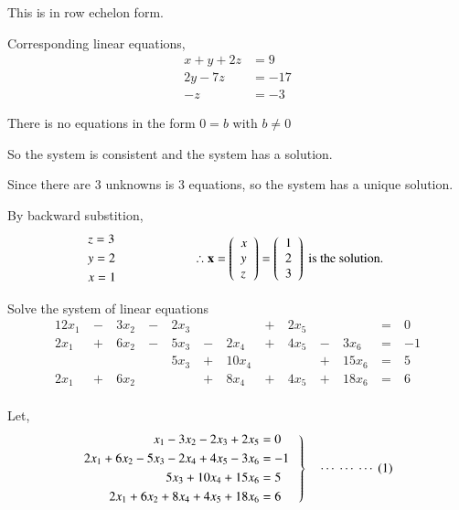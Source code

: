 \documentclass[12pt]{article}
\begin{document}
This is in row echelon form.

Corresponding linear equations,
\vspace{-0.75\baselineskip}
\begin{align*}
   x+y+2z&=9\\
   2y-7z&=-17\\
   -z&=-3
\end{align*}

There is no equations in the form $0=b$ with $b \neq 0$

So the system is consistent and the system has a solution.

Since there are $3$ unknowns is $3$ equations, so the system has a unique solution.


\vspace{2ex}
By backward substition,
\begin{equation*}
\begin{aligned}
& z=3 \\ & y=2 \\ & x=1
\end{aligned} \ \ \ \ \ \  \ \ \ \ \ \  \ \ \ \ \ \  \ \ \ \ \ \  \therefore \mathbf{x}=\left(\begin{array}{l}
x \\ y \\ z
\end{array}\right)=\left(\begin{array}{l}
1 \\ 2 \\ 3
\end{array}\right) \text { is the solution. }
\end{equation*}



\vspace{5ex}
\hrline
{} Solve the system of linear equations
\begin{alignat*}{12}
   x_1 &\ -\ & 3x_2 &\ -\ & 2x_3 &&&\ +\ & 2x_5 &&&\ =\ & 0 \\
   2x_1 &\ +\ & 6x_2 &\ -\ & 5x_3 &\ -\ & 2x_4 &\ +\ & 4x_5 &\ -\ & 3x_6 &\ =\ & -1 \\
   &&&&5x_3 &\ +\ & 10x_4 &&&\ +\ & 15x_6 &\ =\ & 5 \\
   2x_1 &\ +\ & 6x_2 &&&\ +\ & 8x_4 &\ +\ & 4x_5 &\ +\ & 18x_6 &\ =\ & 6 \\
\end{alignat*}

 Let,
\begin{equation*}
   \left.
   \begin{alignedat}{1}
      x_1-3x_2-2x_3+2x_5 &=0 \\
      2x_1+6x_2-5x_3-2x_4+4x_5-3x_6 &=-1 \\
      5x_3+10x_4+15x_6 &=5 \\
      2x_1+6x_2+8x_4+4x_5+18x_6 &=6 \\
   \end{alignedat}
   \ \ \  \right\} \ \ \  \ \cdots \ \cdots \ \cdots \ (1)
\end{equation*}
\end{document}
